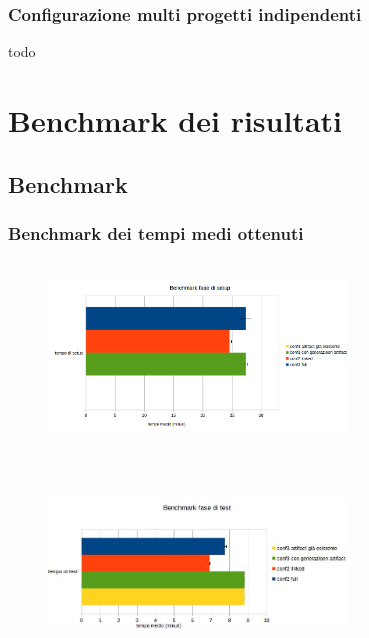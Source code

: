 \documentclass{beamer}
\theoremstyle{definition}
\theoremstyle{plain}
\begin{document}
\begin{frame}
\frametitle{Configurazione multi progetti indipendenti}
todo
\end{frame}

\section{Benchmark dei risultati}

\subsection{Benchmark}
\begin{frame}
\frametitle{Benchmark dei tempi medi ottenuti}
\begin{figure}[!h]
	\begin{center}
\includegraphics[width=8cm, height=5cm]{benchmark_setup.png}
\end{center}
\end{figure}
\end{frame}

\begin{frame}
\begin{figure}[!h]
	\begin{center}
\includegraphics[width=8cm, height=5cm]{benchmark_test.jpg}
\end{center}
\end{figure}
\end{frame}
\end{document}
